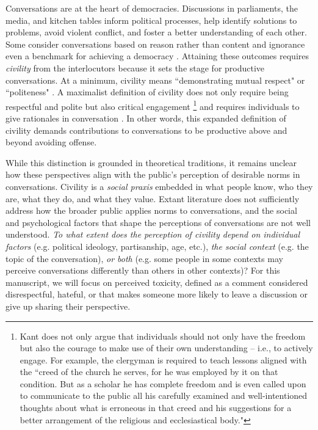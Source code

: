 \documentclass{article}
\begin{document}
Conversations are at the heart of democracies. Discussions in parliaments, the media, and kitchen tables inform political processes, help identify solutions to problems, avoid violent conflict, and foster a better understanding of each other. Some consider conversations based on reason rather than content and ignorance even a benchmark for achieving a democracy \citep{sanders_against_1997}. Attaining these outcomes requires \textit{civility} from the interlocutors because it sets the stage for productive conversations. 
At a minimum,  civility means ``demonstrating mutual respect" \citep{mutz_inyourface_2016} or ``politeness" \citep{frimer_montagu_2018}. A maximalist definition of civility does not only require being respectful and polite but also critical engagement \citep{kant_enlightenment_1784}\footnote{Kant does not only argue that individuals should not only have the freedom but also the courage to make use of their own understanding -- i.e., to actively engage. For example, the clergyman is required to teach lessons aligned with the ``creed of the church he serves, for he was employed by it on that condition. But as a scholar he has complete freedom and is even called upon to communicate to the public all his carefully examined and well-intentioned thoughts about what is erroneous in that creed and his suggestions for a better arrangement of the religious and ecclesiastical body."} and requires individuals to give rationales in conversation \citep{habermas1985theory}. In other words, this expanded definition of civility demands contributions to conversations to be productive above and beyond avoiding offense.

While this distinction is grounded in theoretical traditions, it remains unclear how these perspectives align with the public's perception of desirable norms in conversations. Civility is a \textit{social praxis} embedded in what people know, who they are, what they do, and what they value. Extant literature does not sufficiently address how the broader public applies norms to conversations, and the social and psychological factors that shape the perceptions of conversations are not well understood. \textit{To what extent does the perception of civility depend on individual factors} (e.g. political ideology, partisanship, age, etc.), \textit{the social context} (e.g. the topic of the conversation), \textit{or both} (e.g. some people in some contexts may perceive conversations differently than others in other contexts)? For this manuscript, we will focus on perceived toxicity, defined as a comment considered disrespectful, hateful, or that makes someone more likely to leave a discussion or give up sharing their perspective. 
\end{document}

